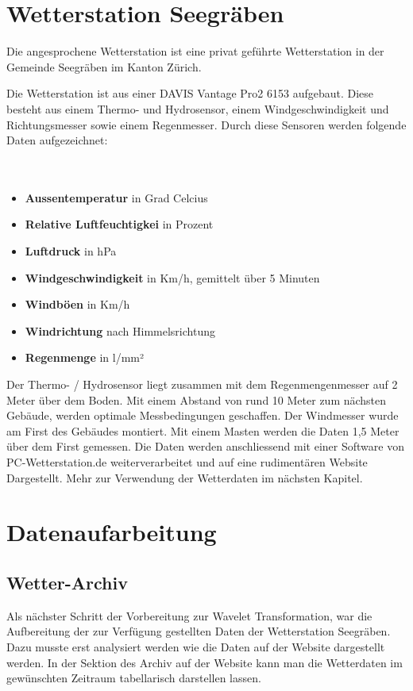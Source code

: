 \begin{refsection}
\section{Wetterstation Seegräben}

Die  angesprochene Wetterstation ist eine privat geführte Wetterstation in der Gemeinde Seegräben im Kanton Zürich.

Die Wetterstation ist aus einer DAVIS Vantage Pro2 6153 aufgebaut.
Diese besteht aus einem Thermo- und  Hydrosensor, einem Windgeschwindigkeit und Richtungsmesser sowie einem Regenmesser. 
Durch diese Sensoren werden folgende Daten aufgezeichnet:
\\
\\
\\


\begin{itemize}
	\item \textbf{Aussentemperatur} in Grad Celcius
	\item \textbf{Relative Luftfeuchtigkei} in Prozent
	\item \textbf{Luftdruck} in hPa
	\item \textbf{Windgeschwindigkeit} in Km/h, gemittelt über 5 Minuten
	\item \textbf{Windböen} in Km/h
	\item \textbf{Windrichtung} nach Himmelsrichtung
	\item \textbf{Regenmenge} in l/mm²
\end{itemize}	


Der Thermo- / Hydrosensor liegt zusammen mit dem Regenmengenmesser auf 2 Meter über dem Boden.
Mit einem Abstand von rund 10 Meter zum nächsten Gebäude, werden optimale Messbedingungen geschaffen.
Der Windmesser wurde am First des Gebäudes montiert.
Mit einem Masten werden die Daten 1,5 Meter über dem First gemessen.\cite{online:wss}
Die Daten werden anschliessend mit einer Software von PC-Wetterstation.de weiterverarbeitet und auf eine rudiment\"aren Website Dargestellt. Mehr zur Verwendung der Wetterdaten im n\"achsten Kapitel.

\section{Datenaufarbeitung}
\subsection{Wetter-Archiv}
Als n\"achster Schritt der Vorbereitung zur Wavelet Transformation, war die Aufbereitung der zur Verf\"ugung gestellten Daten der Wetterstation Seegr\"aben.
Dazu musste erst analysiert werden wie die Daten auf der Website dargestellt werden.
In der Sektion des Archiv auf der Website kann man die Wetterdaten im gew\"unschten Zeitraum tabellarisch darstellen lassen.

\end{refsection}
